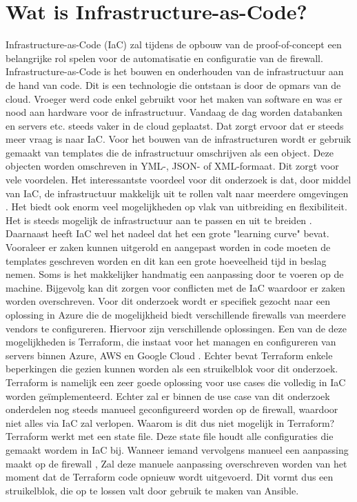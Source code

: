 \section{Wat is Infrastructure-as-Code?}
Infrastructure-as-Code (IaC) zal tijdens de opbouw van de proof-of-concept een belangrijke rol spelen voor de automatisatie en configuratie van de firewall. Infrastructure-as-Code is het bouwen en onderhouden van de infrastructuur aan de hand van code. Dit is een technologie die ontstaan is door de opmars van de cloud. Vroeger werd code enkel gebruikt voor het maken van software en was er nood aan hardware voor de infrastructuur. Vandaag de dag worden databanken en servers etc. steeds vaker in de cloud geplaatst. Dat zorgt ervoor dat er steeds meer vraag is naar IaC. Voor het bouwen van de infrastructuren wordt er gebruik gemaakt van templates die de infrastructuur omschrijven als een object. Deze objecten worden omschreven in YML-, JSON- of XML-formaat. Dit zorgt voor vele voordelen. Het interessantste voordeel voor dit onderzoek is dat, door middel van IaC, de infrastructuur makkelijk uit te rollen valt naar meerdere omgevingen \autocite{Bulthuis}. Het biedt ook enorm veel mogelijkheden op vlak van uitbreiding en flexibiliteit. Het is steeds mogelijk de infrastructuur aan te passen en uit te breiden \autocite{Morris2016}. Daarnaast heeft IaC wel het nadeel dat het een grote "learning curve" bevat. Vooraleer er zaken kunnen uitgerold en aangepast worden in code moeten de templates geschreven worden en dit kan een grote hoeveelheid tijd in beslag nemen. Soms is het makkelijker handmatig een aanpassing door te voeren op de machine. Bijgevolg kan dit zorgen voor conflicten met de IaC waardoor er zaken worden overschreven. Voor dit onderzoek wordt er specifiek gezocht naar een oplossing in Azure die de mogelijkheid biedt verschillende firewalls van meerdere vendors te configureren. 
Hiervoor zijn verschillende oplossingen. Een van de deze mogelijkheden is Terraform, die instaat voor het managen en configureren van servers binnen Azure, AWS en Google Cloud \autocite{IONOS2019} \autocite{Janashia2020}. Echter bevat Terraform enkele beperkingen die gezien kunnen worden als een struikelblok voor dit onderzoek. Terraform is namelijk een zeer goede oplossing voor use cases die volledig in IaC worden geïmplementeerd. Echter zal er binnen de use case van dit onderzoek onderdelen nog steeds manueel geconfigureerd worden op de firewall, waardoor niet alles via IaC zal verlopen. Waarom is dit dus niet mogelijk in Terraform? Terraform werkt met een state file. Deze state file houdt alle configuraties die gemaakt wordem in IaC bij. Wanneer iemand vervolgens manueel een aanpassing maakt op de firewall , Zal deze manuele aanpassing overschreven worden van het moment dat de Terraform code opnieuw wordt uitgevoerd. Dit vormt dus een struikelblok, die op te lossen valt door gebruik te maken van Ansible.  \autocite{Anthony}

